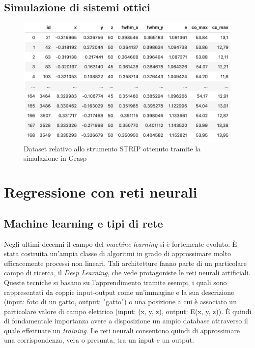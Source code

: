 \documentclass[12pt,a4paper,final]{book}
\begin{document}
\section{Simulazione di sistemi ottici}\label{simulazioni}

\begin{figure}[!ht]
	\centering
	\includegraphics[width=\linewidth]{../figures/dataset.png}
	\caption{Dataset relativo allo strumento STRIP ottenuto tramite la simulazione in Grasp}
	\label{dataset}
\end{figure}




\chapter{Regressione con reti neurali}\label{reg_nn}


\section{Machine learning e tipi di rete}
Negli ultimi decenni il campo del \textit {machine learning} si è fortemente evoluto. È stata costruita un'ampia classe di algoritmi in grado di approssimare molto efficacemente processi non lineari. Tali architetture fanno parte di un particolare campo di ricerca, il \textit {Deep Learning}, che vede protagoniste le reti neurali artificiali. \\
Queste tecniche si basano su l'apprendimento tramite esempi, i quali sono rappresentati da coppie input-output come un'immagine e la sua descrizione (input: foto di un gatto, output: "gatto") o una posizione a cui è associato un particolare valore di campo elettrico (input: (x, y, z), output: E(x, y, z)). È quindi di fondamentale importanza avere a disposizione un ampio database attraverso il quale effettuare un \textit {training}. Le reti neurali consentono quindi di approssimare una corrispondenza, vera o presunta, tra un input e un output. 
\end{document}
